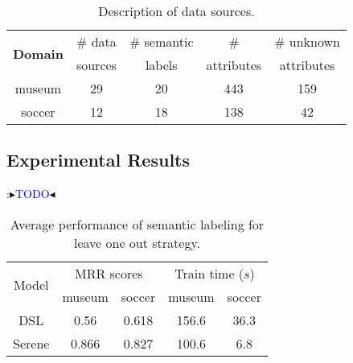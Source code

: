 \documentclass[letterpaper]{article} %
\newcommand{\authornote}[3]{
  {\fbox{\sc 
  #1}:$\blacktriangleright$\textcolor{#2}{\small{#3}}$\blacktriangleleft$}%
}
\newcommand{\ddg}[1]{\authornote{DDG}{blue}{#1}}
\begin{document}
\begin{table}[ht]\small
  \centering
  \caption{Description of data sources.}\label{tab:data}
		\begin{tabular}{ccccc} 
		\hline
		\multirow{2}{*}{\textbf{Domain}} & \# data & \# semantic & \# & \# unknown\\
		 & sources & labels & attributes & attributes\\
		\hline
		museum & 29 & 20 & 443 & 159  \\
		soccer & 12 & 18 & 138 & 42 \\
		\hline
		\end{tabular} 
\end{table}





\subsection{Experimental Results}
\ddg{TODO}

\begin{table}[t]\small
  \centering
  \caption{Average performance of semantic labeling for leave one out strategy.}
  	\label{tab:unknownloo}
  	\begin{tabular}{c|cc|cc} 
  		\hline
  		\multirow{2}{*}{Model} & \multicolumn{2}{c|}{MRR scores} & \multicolumn{2}{c}{Train time ($s$)}\\
  		 & museum & soccer & museum & soccer\\
  		\hline
  		DSL & 0.56 & 0.618 & 156.6 & 36.3\\
 		Serene & 0.866 & 0.827 & 100.6 & 6.8\\
  		\hline
		\end{tabular} 
\end{table}
\end{document}
